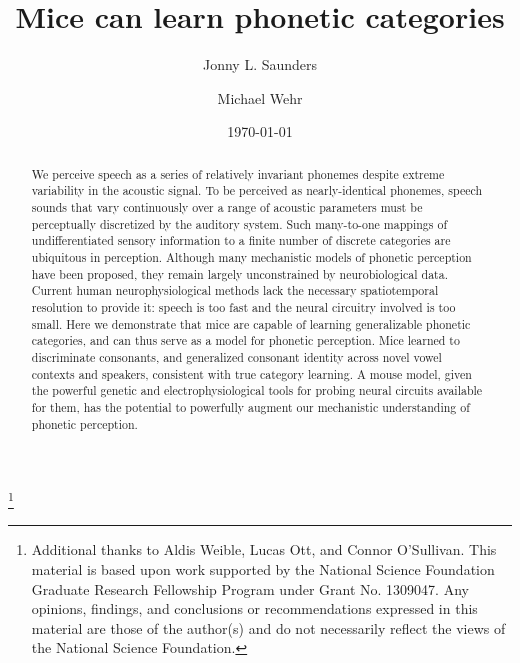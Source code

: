 \documentclass[preprint, NumberedRefs]{JASAnew}\usepackage[]{graphicx}\usepackage[]{color}
\begin{document}
\title{Mice can learn phonetic categories}
\author{Jonny L. Saunders}
\author{Michael Wehr}
\date{\today}

\begin{abstract}
We perceive speech as a series of relatively invariant phonemes despite extreme variability in the acoustic signal. To be perceived as nearly-identical phonemes, speech sounds that vary continuously over a range of acoustic parameters must be perceptually discretized by the auditory system. Such many-to-one mappings of undifferentiated sensory information to a finite number of discrete categories are ubiquitous in perception. Although many mechanistic models of phonetic perception have been proposed, they remain largely unconstrained by neurobiological data. Current human neurophysiological methods lack the necessary spatiotemporal resolution to provide it: speech is too fast and the neural circuitry involved is too small. Here we demonstrate that mice are capable of learning generalizable phonetic categories, and can thus serve as a model for phonetic perception. Mice learned to discriminate consonants, and generalized consonant identity across novel vowel contexts and speakers, consistent with true category learning. A mouse model, given the powerful genetic and electrophysiological tools for probing neural circuits available for them, has the potential to powerfully augment our mechanistic understanding of phonetic perception.

\end{abstract}

\maketitle

\thanks{Additional thanks to Aldis Weible, Lucas Ott, and Connor O'Sullivan. This material is based upon work supported by the National Science Foundation Graduate Research Fellowship Program under Grant No. 1309047. Any opinions, findings, and conclusions or recommendations expressed in this material are those of the author(s) and do not necessarily reflect the views of the National Science Foundation.}

%
%
%
\end{document}

